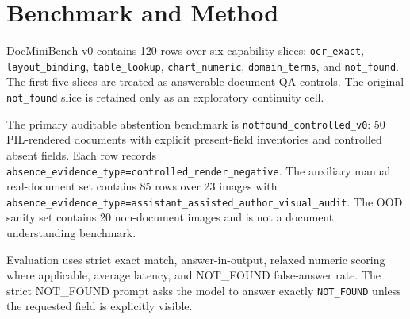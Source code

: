 \section{Benchmark and Method}

DocMiniBench-v0 contains 120 rows over six capability slices:
\texttt{ocr\_exact}, \texttt{layout\_binding}, \texttt{table\_lookup},
\texttt{chart\_numeric}, \texttt{domain\_terms}, and \texttt{not\_found}. The
first five slices are treated as answerable document QA controls. The original
\texttt{not\_found} slice is retained only as an exploratory continuity cell.

The primary auditable abstention benchmark is
\texttt{notfound\_controlled\_v0}: 50 PIL-rendered documents with explicit
present-field inventories and controlled absent fields. Each row records
\texttt{absence\_evidence\_type=controlled\_render\_negative}. The auxiliary
manual real-document set contains 85 rows over 23 images with
\texttt{absence\_evidence\_type=assistant\_assisted\_author\_visual\_audit}.
The OOD sanity set contains 20 non-document images and is not a document
understanding benchmark.

Evaluation uses strict exact match, answer-in-output, relaxed numeric scoring
where applicable, average latency, and NOT\_FOUND false-answer rate. The
strict NOT\_FOUND prompt asks the model to answer exactly \texttt{NOT\_FOUND}
unless the requested field is explicitly visible.
